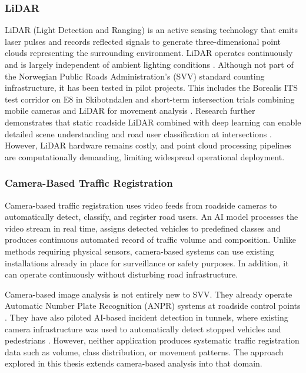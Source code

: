 \subsubsection{LiDAR}
LiDAR (Light Detection and Ranging) is an active sensing technology that emits laser pulses and records reflected signals to generate three-dimensional point clouds representing the surrounding environment. LiDAR operates continuously and is largely independent of ambient lighting conditions \citep{Lv2019_LiDAR}. Although not part of the Norwegian Public Roads Administration's (SVV) standard counting infrastructure, it has been tested in pilot projects. This includes the Borealis ITS test corridor on E8 in Skibotndalen and short-term intersection trials combining mobile cameras and LiDAR for movement analysis \citep{SVV_ITS_teststrekninger, SVV_2025_kryss_lidar_test}. Research further demonstrates that static roadside LiDAR combined with deep learning can enable detailed scene understanding and road user classification at intersections \citep{LiDAR_IEEE}. However, LiDAR hardware remains costly, and point cloud processing pipelines are computationally demanding, limiting widespread operational deployment.


\subsubsection{Camera-Based Traffic Registration}
Camera-based traffic registration uses video feeds from roadside cameras to automatically 
detect, classify, and register road users. An AI model processes the video stream in real 
time, assigns detected vehicles to predefined classes and produces continuous automated record of traffic volume and composition. Unlike methods requiring physical sensors, camera-based systems can use existing installations already in place for 
surveillance or safety purposes. In addition, it can operate continuously without disturbing road infrastructure.

Camera-based image analysis is not entirely new to SVV. They already operate Automatic Number Plate Recognition (ANPR) systems at roadside control points \citep{SVV_ANPR}. They have also piloted AI-based 
incident detection in tunnels, where existing camera infrastructure was used to 
automatically detect stopped vehicles and pedestrians \citep{SVV_AI_tunnel}. However, 
neither application produces systematic traffic registration data such as volume, class 
distribution, or movement patterns. The approach explored in this thesis extends 
camera-based analysis into that domain.

